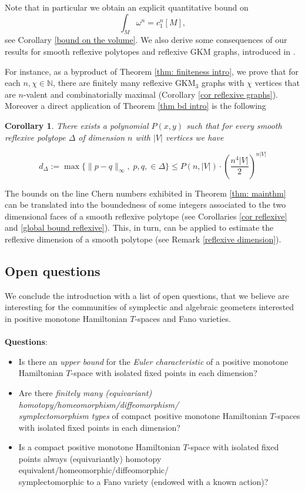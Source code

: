 \documentclass[12pt,a4paper]{amsart}
\newcommand{\NN}{\mathbb{N}}
\newtheorem{cor}[thm]{Corollary}
\theoremstyle{plain}
\theoremstyle{definition}
\begin{document}
Note that in particular we obtain an explicit quantitative bound on \[\int_M \omega^n=c_1^n[M],\]
see Corollary \ref{bound on the volume}.
We also derive some consequences of our results for smooth reflexive polytopes and reflexive GKM graphs, introduced in \cite[Section 5.3]{MR3695881}. 

For instance, as a byproduct of Theorem \ref{thm: finiteness intro}, we prove that for each $n,\chi\in \NN$, there are finitely many reflexive GKM$_3$ graphs with $\chi$
vertices that are $n$-valent and combinatorially maximal (Corollary \ref{cor reflexive graphs}). Moreover
a direct application of Theorem \ref{thm bd intro} is the following
\begin{cor}\label{cor reflexive1}
There exists a polynomial $P(x,y)$ such that for every smooth reflexive polytope $\Delta$ of dimension $n$ with $|V|$ vertices we have

\begin{equation}\label{diameter refl}
d_\Delta:=\max\{\|p-q\|_\infty, \;p,q,\in \Delta\}\leq P(n,|V|)\cdot\left(\frac{n^4|V|}{2}\right)^{n|V|}
\end{equation}

\end{cor}

The bounds on the line Chern numbers exhibited in Theorem \ref{thm: mainthm} can be translated into the boundedness of some integers associated
to the two dimensional faces of a smooth reflexive polytope (see Corollaries \ref{cor reflexive} and \ref{global bound reflexive}). This, in turn, can be applied to estimate
the reflexive dimension of a smooth polytope (see Remark \ref{reflexive dimension}).

\subsection{Open questions}
We conclude the introduction with a list of open questions, that we believe are interesting for the communities of symplectic and algebraic geometers interested
in positive monotone Hamiltonian $T$-spaces and Fano varieties. 
\\$\;$\\
\textbf{Questions}:
\vspace{0.3cm}
\begin{itemize}
\item[(D)] Is there an \emph{upper bound} for the \emph{Euler characteristic} of a positive monotone Hamiltonian $T$-space with isolated fixed points in each dimension? 
\item[(E)] Are there \emph{finitely many (equivariant) homotopy/homeomorphism/diffeomorphism/\\symplectomorphism types} of compact positive monotone Hamiltonian $T$-spaces with isolated fixed points in each dimension?
\item[(F)] Is a compact positive monotone Hamiltonian $T$-space with isolated fixed points always (equivariantly) homotopy equivalent/homeomorphic/diffeomorphic/\\symplectomorphic to a Fano variety (endowed with a known action)?
\end{itemize}
\end{document}
